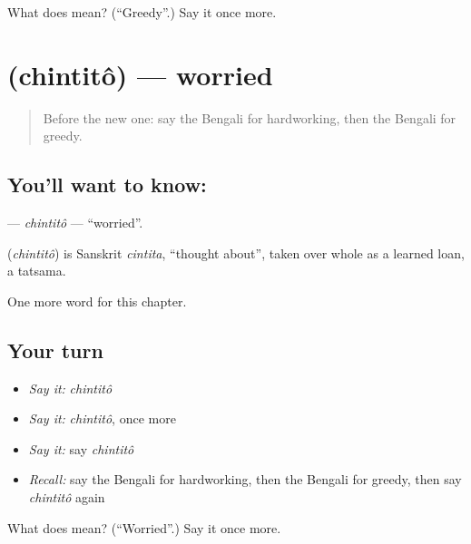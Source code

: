 \begin{tcolorbox}[breakable,colback=teal!4,colframe=teal!35!black,title={Before you move on}]
What does  mean? (\textquotedblleft{}Greedy\textquotedblright{}.) Say it once more.
\end{tcolorbox}
\section[\texorpdfstring{\bn{চিন্তিত} (chintitô)}{চিন্তিত (chintitô)}]{ (chintitô) — worried}

\label{lesson:BN-C160-chintito}



\begin{quote}
Before the new one: say the Bengali for hardworking, then the Bengali for greedy.
\end{quote}

\subsection*{You'll want to know: }
\textbf{} — \emph{chintitô} — \textquotedblleft{}worried\textquotedblright{}.

\begin{cousinweb}
\textbf{} (\emph{chintitô}) is Sanskrit \emph{cintita}, \textquotedblleft{}thought about\textquotedblright{}, taken over whole as a learned loan, a tatsama.
\end{cousinweb}

\begin{grammarlens}[title={What you've built}]
One more word for this chapter.
\end{grammarlens}

\subsection*{Your turn}
\begin{itemize}
\raggedright
  \item \emph{Say it:} \emph{chintitô}
  \item \emph{Say it:} \emph{chintitô}, once more
  \item \emph{Say it:} say \emph{chintitô}
  \item \emph{Recall:} say the Bengali for hardworking, then the Bengali for greedy, then say \emph{chintitô} again
\end{itemize}

\begin{tcolorbox}[breakable,colback=teal!4,colframe=teal!35!black,title={Before you move on}]
What does  mean? (\textquotedblleft{}Worried\textquotedblright{}.) Say it once more.
\end{tcolorbox}
